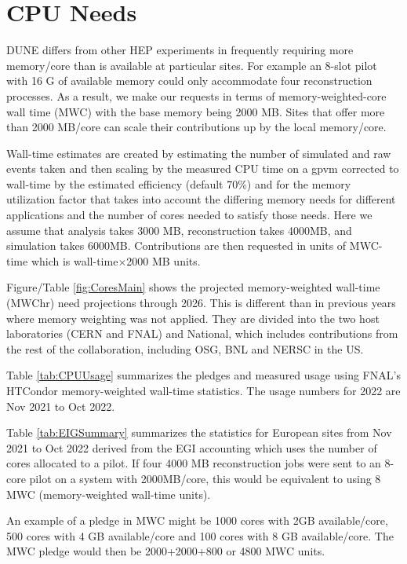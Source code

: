 \documentclass[12pt]{article}
\begin{document}
\clearpage
\section{CPU Needs}

DUNE differs from other HEP experiments in frequently requiring more memory/core than is available at particular sites.  For example an 8-slot pilot with 16 G of available memory could only accommodate four reconstruction processes.   As a result, we make our requests in terms of memory-weighted-core wall time (MWC)  with the base memory being 2000 MB.  Sites that offer more than 2000 MB/core can scale their contributions up by the local memory/core.

Wall-time estimates are created by estimating the number of simulated and raw events taken and then scaling by the measured CPU time on a gpvm corrected to wall-time by the estimated efficiency (default 70\%) and for the memory utilization factor that takes into account the differing memory needs for different applications and the number of cores needed to satisfy those needs.  Here we assume that analysis takes 3000 MB, reconstruction takes 4000MB, and simulation takes 6000MB.  Contributions are then requested in units of MWC-time which is wall-time$\times$2000 MB units. 

Figure/Table \ref{fig:CoresMain} shows the projected memory-weighted wall-time  (MWChr) need projections through 2026.  This is different than in previous years where memory weighting was not applied.   They are divided into the two host laboratories (CERN and FNAL) and National, which includes contributions from the rest of the collaboration, including OSG, BNL and NERSC in the US. 


Table \ref{tab:CPUUsage} summarizes the pledges\cite{CCB2022} and measured usage using FNAL's  HTCondor memory-weighted wall-time statistics\cite{fifemonDUNE}.  The  usage numbers for 2022 are Nov 2021 to Oct 2022. 

Table \ref{tab:EIGSummary} summarizes the statistics for European sites from Nov 2021 to Oct 2022 derived from the EGI accounting\cite{EGI2022} which uses the number of cores allocated to a pilot.   If four 4000 MB reconstruction jobs were sent to an 8-core pilot on a system with 2000MB/core, this would be equivalent to using 8 MWC (memory-weighted wall-time units).   

An example of a  pledge in MWC might be  1000 cores with 2GB available/core, 500 cores with 4 GB available/core and 100 cores with 8 GB available/core.  The MWC pledge would then be 2000+2000+800 or 4800 MWC units.  
\end{document}
